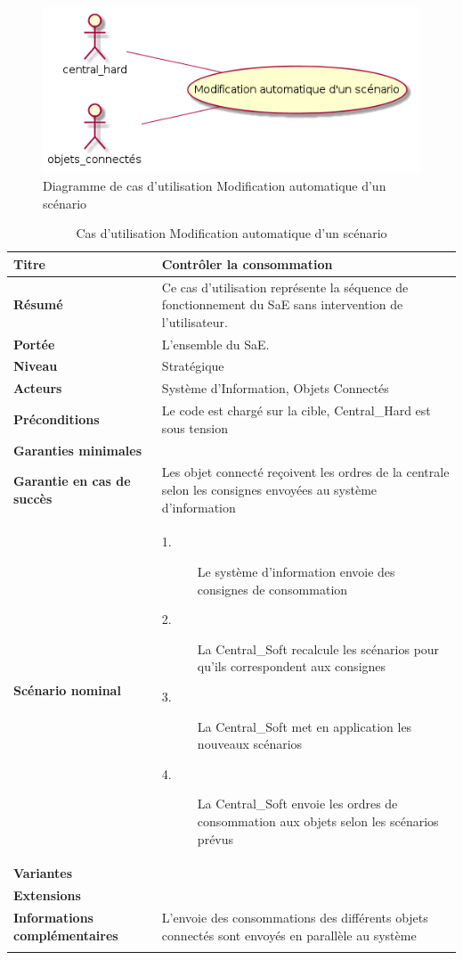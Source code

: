 \documentclass[10pt,a4paper]{report}
\renewcommand{\arraystretch}{1.2}
\begin{document}
\begin{figure}[H]
	\centering
	\includegraphics[scale=0.55]{diagCU_ModifAutoScenar}
	\caption{Diagramme de cas d'utilisation Modification automatique d'un scénario}
	\label{diagCuModifAutoScenar}
\end{figure}

{
\renewcommand{\arraystretch}{1.2}
\begin{longtable}{| p{5cm} | p{11cm} |}
	\hline
	\cellcolor{lightgray}\textbf{\textbf{Titre}} & \cellcolor{lightgray}\textbf{Contrôler la consommation}\tabularnewline
	\hline
	\textbf{Résumé} & Ce cas d'utilisation représente la séquence de fonctionnement du SaE sans intervention de l'utilisateur.\tabularnewline
	\hline
	\textbf{Portée} & L'ensemble du SaE.\tabularnewline
	\hline
	\textbf{Niveau} & Stratégique\tabularnewline
	\hline
	\textbf{Acteurs} & Système d'Information, Objets Connectés\tabularnewline
	\hline
	\textbf{Préconditions } & Le code est chargé sur la cible, Central\_Hard est sous tension\tabularnewline
	\hline
	\textbf{Garanties minimales} & \tabularnewline
	\hline
	\textbf{Garantie en cas de succès} & Les objet connecté reçoivent les ordres de la centrale selon les consignes envoyées au système d'information\tabularnewline
	\hline
	\textbf{Scénario nominal} & \begin{description}
		\item[1.] Le système d'information envoie des consignes de consommation 
		\item[2.] La Central\_Soft recalcule les scénarios pour qu'ils correspondent aux consignes
		\item[3.] La Central\_Soft met en application les nouveaux scénarios
		\item[4.] La Central\_Soft envoie les ordres de consommation aux objets selon les scénarios prévus
	\end{description}\tabularnewline
	\hline 
	\textbf{Variantes} & \tabularnewline
	\hline
	\textbf{Extensions} & \tabularnewline
	\hline
	\textbf{Informations complémentaires} & L'envoie des consommations des différents objets connectés sont envoyés en parallèle au système\tabularnewline
	\hline
\caption{Cas d'utilisation Modification automatique d'un scénario}	
\label{tableUC_ModifAutoScenar}
\end{longtable}
}
\end{document}
